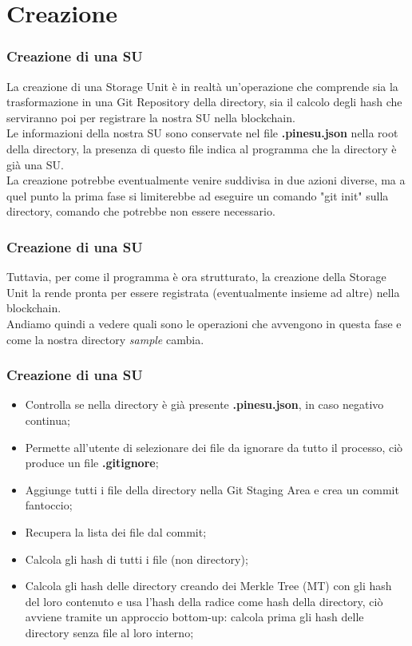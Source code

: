 \documentclass{beamer}
\begin{document}
\section{Creazione}
\begin{frame}
	\frametitle{Creazione di una SU}
	La creazione di una Storage Unit è in realtà un'operazione che comprende sia la trasformazione in una Git Repository della directory, sia il calcolo degli hash che serviranno poi per registrare la nostra SU nella blockchain.
	\\

	Le informazioni della nostra SU sono conservate nel file \textbf{.pinesu.json} nella root della directory, la presenza di questo file indica al programma che la directory è già una SU.
	\\

	La creazione potrebbe eventualmente venire suddivisa in due azioni diverse, ma a quel punto la prima fase si limiterebbe ad eseguire un comando "git init" sulla directory, comando che potrebbe non essere necessario.
\end{frame}
\begin{frame}
	\frametitle{Creazione di una SU}
	Tuttavia, per come il programma è ora strutturato, la creazione della Storage Unit la rende pronta per essere registrata (eventualmente insieme ad altre) nella blockchain.
	\\

	Andiamo quindi a vedere quali sono le operazioni che avvengono in questa fase e come la nostra directory \emph{sample} cambia.
\end{frame}
\begin{frame}
	\frametitle{Creazione di una SU}
	\begin{itemize}
		\item Controlla se nella directory è già presente \textbf{.pinesu.json}, in caso negativo continua;
		\item Permette all'utente di selezionare dei file da ignorare da tutto il processo, ciò produce un file \textbf{.gitignore};
		\item Aggiunge tutti i file della directory nella Git Staging Area e crea un commit fantoccio;
		\item Recupera la lista dei file dal commit;
		\item Calcola gli hash di tutti i file (non directory);
		\item Calcola gli hash delle directory creando dei Merkle Tree (MT) con gli hash del loro contenuto e usa l'hash della radice come hash della directory, ciò avviene tramite un approccio bottom-up: calcola prima gli hash delle directory senza file al loro interno;
	\end{itemize}
\end{frame}
\end{document}
